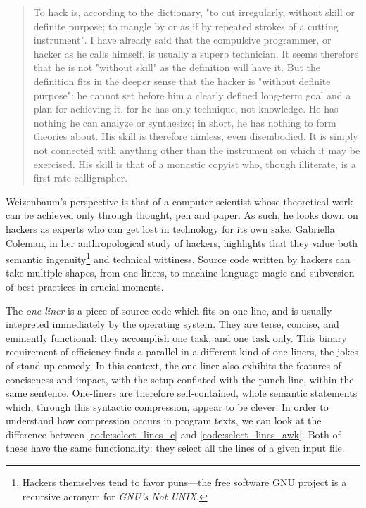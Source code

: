 \begin{quote}
  To hack is, according to the dictionary, "to cut irregularly, without skill or definite purpose; to mangle by or as if by repeated strokes of a cutting instrument". I have already said that the compulsive programmer, or hacker as he calls himself, is usually a superb technician. It seems therefore that he is not "without skill" as the definition will have it. But the definition fits in the deeper sense that the hacker is "without definite purpose": he cannot set before him a clearly defined long-term goal and a plan for achieving it, for he has only technique, not knowledge. He has nothing he can analyze or synthesize; in short, he has nothing to form theories about. His skill is therefore aimless, even disembodied. It is simply not connected with anything other than the instrument on which it may be exercised. His skill is that of a monastic copyist who, though illiterate, is a first rate calligrapher. \citep{weizenbaum_computer_1976}
\end{quote}

Weizenbaum's perspective is that of a computer scientist whose theoretical work can be achieved only through thought, pen and paper. As such, he looks down on hackers as experts who can get lost in technology for its own sake. Gabriella Coleman, in her anthropological study of hackers, highlights that they value both semantic ingenuity\footnote{Hackers themselves tend to favor puns—the free software GNU project is a recursive acronym for \emph{GNU's Not UNIX}.} and technical wittiness\citep{coleman_coding_2012}. Source code written by hackers can take multiple shapes, from one-liners, to machine language magic and subversion of best practices in crucial moments.

The \emph{one-liner} is a piece of source code which fits on one line, and is usually intepreted immediately by the operating system. They are terse, concise, and eminently functional: they accomplish one task, and one task only. This binary requirement of efficiency finds a parallel in a different kind of one-liners, the jokes of stand-up comedy. In this context, the one-liner also exhibits the features of conciseness and impact, with the setup conflated with the punch line, within the same sentence. One-liners are therefore self-contained, whole semantic statements which, through this syntactic compression, appear to be clever. In order to understand how compression occurs in program texts, we can look at the difference between \ref{code:select_lines_c} and \ref{code:select_lines_awk}. Both of these have the same functionality: they select all the lines of a given input file.

